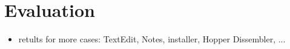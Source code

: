 \section{Evaluation}
\begin{itemize}
\item retults for more cases: TextEdit, Notes, installer, Hopper Dissembler, ...
\end{itemize}
